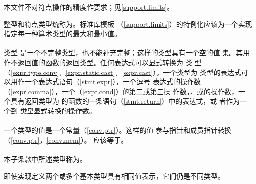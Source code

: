 \begin{note}
  本文件不对符点操作的精度作要求；见\ref{support.limits}。
\end{note}

整型和符点类型统称为。标准库模板
（\ref{support.limits}）的特例化应该为一个实现指定每一种算术类型的最大和最小值。

\paragraph{} %
类型 是一个不完整类型，也不能补充完整；这样的类型具有一个空的值
集。其用作不返回值的函数的返回类型。任何表达式可以显式转换为 类
型（\ref{expr.type.conv}，\ref{expr.static.cast}，\ref{expr.cast}）。一个类型为
 类型的表达式可以用作一个表达式语句（\ref{stmt.expr}），一个逗号
表达式的操作数（\ref{expr.comma}），一个（\ref{expr.cond}）的第二或第三操
作数，、或的操作数，一个具有返回类型为
 的函数的一条语句（\ref{stmt.return}）中的表达式，或
者作为一个到 类型显式转换的操作数。

\paragraph{} %
一个类型的值是一个\nullp{}常量（\ref{conv.ptr}）。这样的值
参与指针和成员指针转换（\ref{conv.ptr}，\ref{conv.mem}）。
应该等于。

\paragraph{} %
本子条款中所述类型称为。

\begin{note}
  即使实现定义两个或多个基本类型具有相同值表示，它们仍是不同类型。
\end{note}
